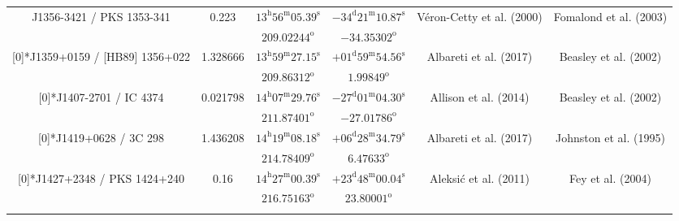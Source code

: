 \begin{landscape}
\begin{longtable}{cccccc}
  \multirow{2}[0]{*}{J1356-3421 / PKS 1353-341} & \multirow{2}[0]{*}{0.223} &  
    $13^\text{h}56^\text{m}05.39^\text{s} $  & $-34^\text{d}21^\text{m}10.87^\text{s} $  & 
    \multirow{2}[0]{*}{V{\'e}ron-Cetty et al. (2000)\cite{RedRef58_2000}}& \multirow{2}[0]{*}{Fomalond et al. (2003) \cite{CoordRef25_2003}} \\*
    & & $209.02244^\text{o}$ & $-34.35302^\text{o}$ & & \\ \addlinespace 

  \multirow{2}[0]{*}{J1359+0159 / [HB89] 1356+022} & \multirow{2}[0]{*}{1.328666} &  
    $13^\text{h}59^\text{m}27.15^\text{s}$  & $+01^\text{d}59^\text{m}54.56^\text{s}$  & 
    \multirow{2}[0]{*}{Albareti et al. (2017)\cite{RedRef9_2017}}& \multirow{2}[0]{*}{Beasley et al. (2002)\cite{CoordRef4_2002}} \\*
    & & $209.86312^\text{o}$ & $1.99849^\text{o}$ & & \\ \addlinespace 
  \multirow{2}[0]{*}{J1407-2701 / IC 4374} & \multirow{2}[0]{*}{0.021798} &  
    $14^\text{h}07^\text{m}29.76^\text{s}$  & $-27^\text{d}01^\text{m}04.30^\text{s}$  & 
    \multirow{2}[0]{*}{Allison et al. (2014) \cite{RedRef23_2014}}& \multirow{2}[0]{*}{Beasley et al. (2002)\cite{CoordRef4_2002}} \\*
    & & $211.87401^\text{o}$ & $-27.01786^\text{o}$ & & \\ \addlinespace 

 \multirow{2}[0]{*}{J1419+0628 / 3C 298} & \multirow{2}[0]{*}{1.436208} &  
    $14^\text{h}19^\text{m}08.18^\text{s}$  & $+06^\text{d}28^\text{m}34.79^\text{s}$  & 
    \multirow{2}[0]{*}{Albareti et al. (2017)\cite{RedRef9_2017}}& \multirow{2}[0]{*}{Johnston et al. (1995)\cite{CoordRef0_1995}} \\*
    & & $214.78409^\text{o}$ & $6.47633^\text{o}$ & & \\ \addlinespace 

  \multirow{2}[0]{*}{J1427+2348 / PKS 1424+240} & \multirow{2}[0]{*}{0.16} &  
    $14^\text{h}27^\text{m}00.39^\text{s}$  & $+23^\text{d}48^\text{m}00.04^\text{s}$  & 
    \multirow{2}[0]{*}{Aleksi{\'c} et al. (2011)\cite{RedRef62_2011}}& \multirow{2}[0]{*}{Fey et al. (2004)\cite{CoordRef2_2004}} \\*
     & & $216.75163^\text{o}$ & $23.80001^\text{o}$ & & \\ \addlinespace 


\end{longtable}
\end{landscape}
